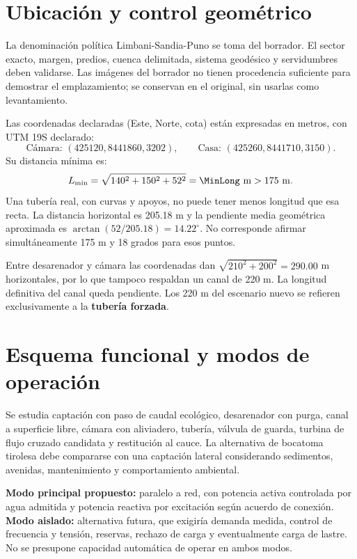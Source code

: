 \section{Ubicación y control geométrico}
La denominación política Limbani-Sandia-Puno se toma del borrador. El sector exacto, margen, predios, cuenca delimitada, sistema geodésico y servidumbres deben validarse. Las imágenes del borrador no tienen procedencia suficiente para demostrar el emplazamiento; se conservan en el original, sin usarlas como levantamiento.

Las coordenadas declaradas (Este, Norte, cota) están expresadas en metros, con UTM 19S declarado:
\[
\text{Cámara: }(425120,8441860,3202),\qquad
\text{Casa: }(425260,8441710,3150).
\]
Su distancia mínima es:
\begin{equation}
L_{\min}=\sqrt{140^2+150^2+52^2}=\MinLong\ \mathrm{m}>175\ \mathrm{m}.
\end{equation}
Una tubería real, con curvas y apoyos, no puede tener menos longitud que esa recta. La distancia horizontal es 205.18 m y la pendiente media geométrica aproximada es $\arctan(52/205.18)=14.22^\circ$. No corresponde afirmar simultáneamente 175 m y 18 grados para esos puntos.

Entre desarenador y cámara las coordenadas dan $\sqrt{210^2+200^2}=290.00$ m horizontales, por lo que tampoco respaldan un canal de 220 m. La longitud definitiva del canal queda pendiente. Los 220 m del escenario nuevo se refieren exclusivamente a la \textbf{tubería forzada}.

\section{Esquema funcional y modos de operación}
Se estudia captación con paso de caudal ecológico, desarenador con purga, canal a superficie libre, cámara con aliviadero, tubería, válvula de guarda, turbina de flujo cruzado candidata y restitución al cauce. La alternativa de bocatoma tirolesa debe compararse con una captación lateral considerando sedimentos, avenidas, mantenimiento y comportamiento ambiental.

\textbf{Modo principal propuesto:} paralelo a red, con potencia activa controlada por agua admitida y potencia reactiva por excitación según acuerdo de conexión. \textbf{Modo aislado:} alternativa futura, que exigiría demanda medida, control de frecuencia y tensión, reservas, rechazo de carga y eventualmente carga de lastre. No se presupone capacidad automática de operar en ambos modos.

